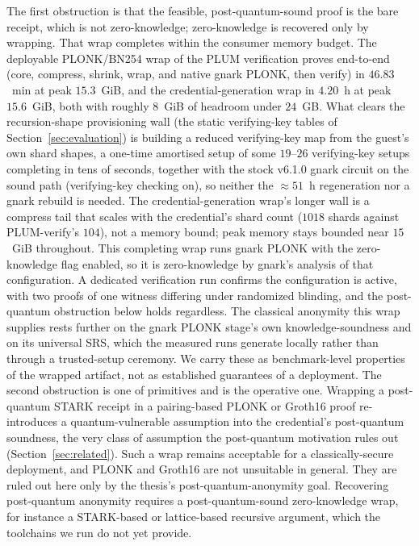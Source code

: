 The first obstruction is that the feasible, post-quantum-sound proof is the bare receipt, which is not zero-knowledge; zero-knowledge is recovered only by wrapping. That wrap completes within the consumer memory budget. The deployable PLONK/BN254 wrap of the PLUM verification proves end-to-end (core, compress, shrink, wrap, and native gnark PLONK, then verify) in $46.83$~min at peak $15.3$~GiB, and the credential-generation wrap in $4.20$~h at peak $15.6$~GiB, both with roughly $8$~GiB of headroom under $24$~GB. What clears the recursion-shape provisioning wall (the static verifying-key tables of Section~\ref{sec:evaluation}) is building a reduced verifying-key map from the guest's own shard shapes, a one-time amortised setup of some $19$--$26$ verifying-key setups completing in tens of seconds, together with the stock v6.1.0 gnark circuit on the sound path (verifying-key checking on), so neither the ${\approx}51$~h regeneration nor a gnark rebuild is needed. The credential-generation wrap's longer wall is a compress tail that scales with the credential's shard count ($1018$ shards against PLUM-verify's $104$), not a memory bound; peak memory stays bounded near $15$~GiB throughout. This completing wrap runs gnark PLONK with the zero-knowledge flag enabled, so it is zero-knowledge by gnark's analysis of that configuration. A dedicated verification run confirms the configuration is active, with two proofs of one witness differing under randomized blinding, and the post-quantum obstruction below holds regardless. The classical anonymity this wrap supplies rests further on the gnark PLONK stage's own knowledge-soundness and on its universal SRS, which the measured runs generate locally rather than through a trusted-setup ceremony. We carry these as benchmark-level properties of the wrapped artifact, not as established guarantees of a deployment. The second obstruction is one of primitives and is the operative one. Wrapping a post-quantum STARK receipt in a pairing-based PLONK or Groth16 proof re-introduces a quantum-vulnerable assumption into the credential's post-quantum soundness, the very class of assumption the post-quantum motivation rules out (Section~\ref{sec:related}). Such a wrap remains acceptable for a classically-secure deployment, and PLONK and Groth16 are not unsuitable in general. They are ruled out here only by the thesis's post-quantum-anonymity goal. Recovering post-quantum anonymity requires a post-quantum-sound zero-knowledge wrap, for instance a STARK-based or lattice-based recursive argument, which the toolchains we run do not yet provide.


